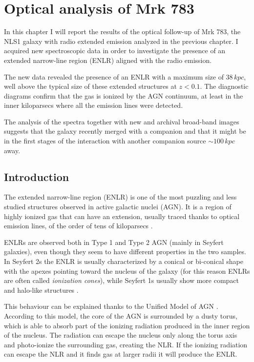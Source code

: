 \documentclass[../main.tex]{subfiles}
\begin{document}
\chapter{Optical analysis of Mrk 783}
\label{cap:paper3}

In this chapter I will report the results of the optical follow-up of Mrk 783, the NLS1 galaxy with radio extended emission analyzed in the previous chapter.
I acquired new spectroscopic data in order to investigate the presence of an extended narrow-line region (ENLR) aligned with the radio emission.

The new data revealed the presence of an ENLR with a maximum size of $38\,\si{kpc}$, well above the typical size of these extended structures at $z<0.1$.
The diagnostic diagrams confirm that the gas is ionized by the AGN continuum, at least in the inner kiloparsecs where all the emission lines were detected.

The analysis of the spectra together with new and archival broad-band images suggests that the galaxy recently merged with a companion and that it might be in the first stages of the interaction with another companion source $\sim 100\,\si{kpc}$ away. 

\section{Introduction}
\label{sec:pap3_intro}

The extended narrow-line region (ENLR) is one of the most puzzling and less studied structures observed in active galactic nuclei (AGN).
It is a region of highly ionized gas that can have an extension, usually traced thanks to optical emission lines, of the order of tens of kiloparsecs \citep[e.g.][]{Stockton87,Tadhunter89,Keel12}.

ENLRs are observed both in Type 1 and Type 2 AGN (mainly in Seyfert galaxies), even though they seem to have different properties in the two samples.
In Seyfert 2s the ENLR is usually characterized by a conical or bi-conical shape with the apexes pointing toward the nucleus of the galaxy (for this reason ENLRs are often called \emph{ionization cones}), while Seyfert 1s usually show more compact and halo-like structures \citep{Schmitt03,Schmitt03b}.

This behaviour can be explained thanks to the Unified Model of AGN \citep{Antonucci93,Urry95}.
According to this model, the core of the AGN is surrounded by a dusty torus, which is able to absorb part of the ionizing radiation produced in the inner region of the nucleus.
The radiation can escape the nucleus only along the torus axis and photo-ionize the surrounding gas, creating the NLR.
If the ionizing radiation can escape the NLR and it finds gas at larger radii it will produce the ENLR.
\end{document}
